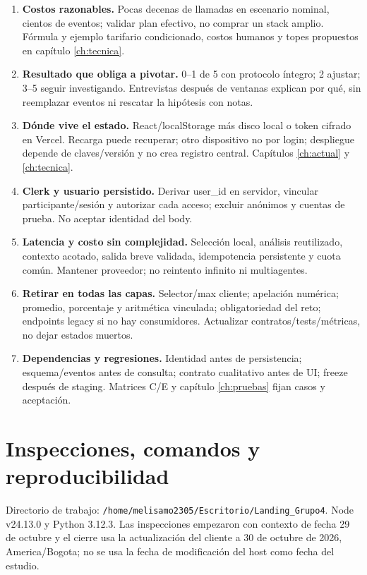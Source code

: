 \documentclass[11pt,a4paper]{report}
\begin{document}
\begin{enumerate}
\item \textbf{Costos razonables.} Pocas decenas de llamadas en escenario nominal, cientos de eventos; validar plan efectivo, no comprar un stack amplio. Fórmula y ejemplo tarifario condicionado, costos humanos y topes propuestos en capítulo \ref{ch:tecnica}.
\item \textbf{Resultado que obliga a pivotar.} 0--1 de 5 con protocolo íntegro; 2 ajustar; 3--5 seguir investigando. Entrevistas después de ventanas explican por qué, sin reemplazar eventos ni rescatar la hipótesis con notas.
\item \textbf{Dónde vive el estado.} React/localStorage más disco local o token cifrado en Vercel. Recarga puede recuperar; otro dispositivo no por login; despliegue depende de claves/versión y no crea registro central. Capítulos \ref{ch:actual} y \ref{ch:tecnica}.
\item \textbf{Clerk y usuario persistido.} Derivar user\_id en servidor, vincular participante/sesión y autorizar cada acceso; excluir anónimos y cuentas de prueba. No aceptar identidad del body.
\item \textbf{Latencia y costo sin complejidad.} Selección local, análisis reutilizado, contexto acotado, salida breve validada, idempotencia persistente y cuota común. Mantener proveedor; no reintento infinito ni multiagentes.
\item \textbf{Retirar en todas las capas.} Selector/max cliente; apelación numérica; promedio, porcentaje y aritmética vinculada; obligatoriedad del reto; endpoints legacy si no hay consumidores. Actualizar contratos/tests/métricas, no dejar estados muertos.
\item \textbf{Dependencias y regresiones.} Identidad antes de persistencia; esquema/eventos antes de consulta; contrato cualitativo antes de UI; freeze después de staging. Matrices C/E y capítulo \ref{ch:pruebas} fijan casos y aceptación.
\end{enumerate}

\chapter{Inspecciones, comandos y reproducibilidad}
\label{ap:comandos}
Directorio de trabajo: \nolinkurl{/home/melisamo2305/Escritorio/Landing_Grupo4}. Node v24.13.0 y Python 3.12.3. Las inspecciones empezaron con contexto de fecha 29 de octubre y el cierre usa la actualización del cliente a 30 de octubre de 2026, America/Bogota; no se usa la fecha de modificación del host como fecha del estudio.
\end{document}
